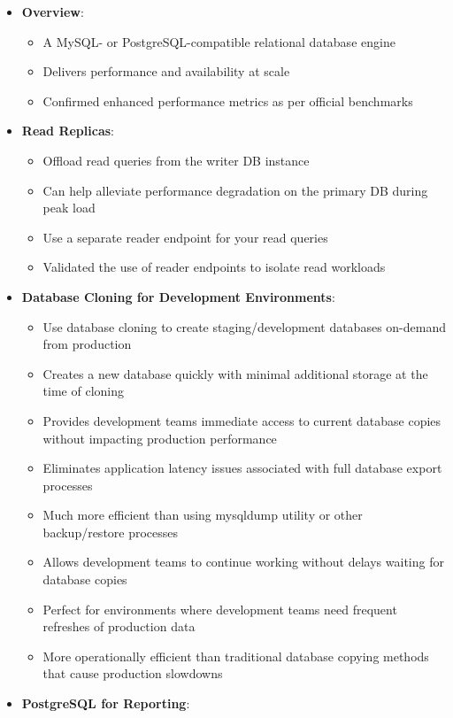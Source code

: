 \documentclass[11pt,a4paper]{report}
\begin{document}
\begin{itemize}
  \item \textbf{Overview}:
\begin{itemize}
  \item A MySQL- or PostgreSQL-compatible relational database engine
  \item Delivers performance and availability at scale
  \item Confirmed enhanced performance metrics as per official benchmarks
\end{itemize}
  \item \textbf{Read Replicas}:
\begin{itemize}
  \item Offload read queries from the writer DB instance
  \item Can help alleviate performance degradation on the primary DB during peak load
  \item Use a separate reader endpoint for your read queries
  \item Validated the use of reader endpoints to isolate read workloads
\end{itemize}
  \item \textbf{Database Cloning for Development Environments}:
\begin{itemize}
  \item Use database cloning to create staging/development databases on-demand from production
  \item Creates a new database quickly with minimal additional storage at the time of cloning
  \item Provides development teams immediate access to current database copies without impacting production performance
  \item Eliminates application latency issues associated with full database export processes
  \item Much more efficient than using mysqldump utility or other backup/restore processes
  \item Allows development teams to continue working without delays waiting for database copies
  \item Perfect for environments where development teams need frequent refreshes of production data
  \item More operationally efficient than traditional database copying methods that cause production slowdowns
\end{itemize}
  \item \textbf{PostgreSQL for Reporting}:
\begin{itemize}

\end{itemize}
\end{itemize}
\end{document}
